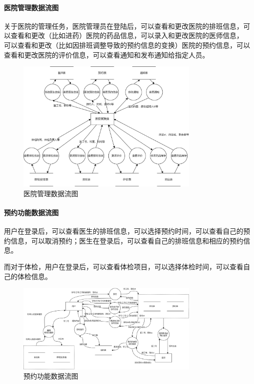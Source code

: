 \documentclass{article}
\begin{document}
\paragraph{医院管理数据流图}

关于医院的管理任务，医院管理员在登陆后，可以查看和更改医院的排班信息，可以查看和更改（比如进药）医院的药品信息，可以录入和更改医院的医师信息，
可以查看和更改（比如因排班调整导致的预约信息的变换）医院的预约信息，可以查看和更改医院的评价信息，可以查看通知和发布通知给指定人员。

\begin{figure}[H]
    \centering
    \includegraphics[width=0.8\textwidth]{images/doctorAdmin_dataflow.png}
    \caption{医院管理数据流图}
\end{figure}

\paragraph{预约功能数据流图}

用户在登录后，可以查看医生的排班信息，可以选择预约时间，可以查看自己的预约信息，可以取消预约；医生在登录后，可以查看自己的排班信息和相应的预约信息。

而对于体检，用户在登录后，可以查看体检项目，可以选择体检时间，可以查看自己的体检信息。

\begin{figure}[H]
    \centering
    \includegraphics[width=0.8\textwidth]{images/appointment_dataflow.png}
    \caption{预约功能数据流图}
\end{figure}
\end{document}
